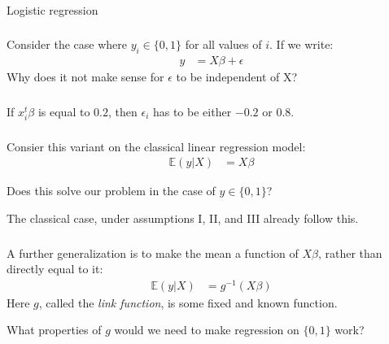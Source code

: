 \begin{frame}[fragile] \frametitle{}

\begin{flushright}
{\color{yaleblue}\sc\fontsize{1cm}{0cm}\selectfont Logistic regression}
\end{flushright}

\end{frame}

\begin{frame}[fragile] \frametitle{}

Consider the case where $y_i \in \{0,1\}$ for all values of $i$.
If we write:
\begin{align*}
y &= X \beta + \epsilon
\end{align*}
Why does it not make sense for $\epsilon$ to be independent of X?

\end{frame}

\begin{frame}[fragile] \frametitle{}

If $x_i^t \beta$ is equal to $0.2$, then $\epsilon_i$
has to be either $-0.2$ or $0.8$.

\end{frame}

\begin{frame}[fragile] \frametitle{}

Consier this variant on the classical linear regression
model:
\begin{align*}
\mathbb{E} (y | X) &= X \beta
\end{align*}

\pause Does this solve our problem in the case of $y \in \{0,1\}$?

 The classical case, under assumptions I, II, and III
already follow this.

\end{frame}

\begin{frame}[fragile] \frametitle{}

A further generalization is to make the mean a function of $X\beta$,
rather than directly equal to it:
\begin{align*}
\mathbb{E} (y | X) &= g^{-1} \left( X \beta \right)
\end{align*}
\pause Here $g$, called the \textit{link function}, is
some fixed and known function.

\pause What properties of $g$ would we need to make regression on $\{0,1\}$
work?

\end{frame}


